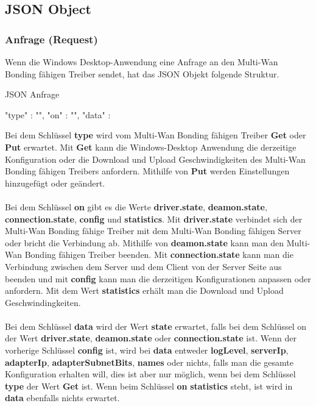 \newpage
\subsection{JSON Object}
\subsubsection{Anfrage (Request)}
Wenn die Windows Desktop-Anwendung eine Anfrage an den Multi-Wan Bonding fähigen Treiber sendet, hat das JSON Objekt folgende Struktur.
\begin{program}[H]
\caption{JSON Anfrage}
\begin{GenericCode}
    {
        "type" :  "",
        "on" :  "",
        "data" : {} 
    }
\end{GenericCode}
\end{program}
\noindent
Bei dem Schlüssel \textbf{type} wird vom Multi-Wan Bonding fähigen Treiber \textbf{Get} oder \textbf{Put} erwartet. Mit \textbf{Get} kann die Windows-Desktop Anwendung die derzeitige Konfiguration oder die Download und Upload Geschwindigkeiten des Multi-Wan Bonding fähigen Treibers anfordern. Mithilfe von \textbf{Put} werden Einstellungen hinzugefügt oder geändert. 
\\\\
Bei dem Schlüssel \textbf{on} gibt es die Werte \textbf{driver.state}, \textbf{deamon.state}, \textbf{connection.state}, \textbf{config} und \textbf{statistics}. Mit \textbf{driver.state} verbindet sich der Multi-Wan Bonding fähige Treiber mit dem Multi-Wan Bonding fähigen Server oder bricht die Verbindung ab. Mithilfe von \textbf{deamon.state} kann man den Multi-Wan Bonding fähigen Treiber beenden. Mit \textbf{connection.state} kann man die Verbindung zwischen dem Server und dem Client von der Server Seite aus beenden und mit \textbf{config} kann man die derzeitigen Konfigurationen anpassen oder anfordern. Mit dem Wert \textbf{statistics} erhält man die Download und Upload Geschwindingkeiten.
\\\\
Bei dem Schlüssel \textbf{data} wird der Wert \textbf{state} erwartet, falls bei dem Schlüssel on der Wert \textbf{driver.state}, \textbf{deamon.state} oder \textbf{connection.state} ist. Wenn der vorherige Schlüssel \textbf{config} ist, wird bei \textbf{data} entweder \textbf{logLevel}, \textbf{serverIp}, \textbf{adapterIp}, \textbf{adapterSubnetBits}, \textbf{names} oder nichts, falls man die gesamte Konfiguration erhalten will, dies ist aber nur möglich, wenn bei dem Schlüssel \textbf{type} der Wert \textbf{Get} ist. Wenn beim Schlüssel \textbf{on} \textbf{statistics} steht, ist wird in \textbf{data} ebenfalls nichts erwartet. 


